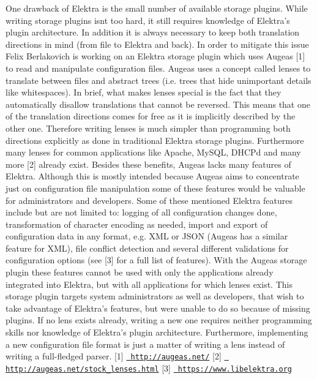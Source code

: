 One drawback of Elektra is the small number of available storage plugins. While writing storage plugins isn\textquotesingle{}t too hard, it still requires knowledge of Elektra’s plugin architecture. In addition it is always necessary to keep both translation directions in mind (from file to Elektra and back). In order to mitigate this issue Felix Berlakovich is working on an Elektra storage plugin which uses Augeas \mbox{[}1\mbox{]} to read and manipulate configuration files. Augeas uses a concept called lenses to translate between files and abstract trees (i.\+e. trees that hide unimportant details like whitespaces). In brief, what makes lenses special is the fact that they automatically disallow translations that cannot be reversed. This means that one of the translation directions comes for free as it is implicitly described by the other one. Therefore writing lenses is much simpler than programming both directions explicitly as done in traditional Elektra storage plugins. Furthermore many lenses for common applications like Apache, My\+S\+QL, D\+H\+C\+Pd and many more \mbox{[}2\mbox{]} already exist. Besides these benefits, Augeas lacks many features of Elektra. Although this is mostly intended because Augeas aims to concentrate just on configuration file manipulation some of these features would be valuable for administrators and developers. Some of these mentioned Elektra features include but are not limited to\+: logging of all configuration changes done, transformation of character encoding as needed, import and export of configuration data in any format, e.\+g. X\+ML or J\+S\+ON (Augeas has a similar feature for X\+ML), file conflict detection and several different validations for configuration options (see \mbox{[}3\mbox{]} for a full list of features). With the Augeas storage plugin these features cannot be used with only the applications already integrated into Elektra, but with all applications for which lenses exist. This storage plugin targets system administrators as well as developers, that wish to take advantage of Elektra’s features, but were unable to do so because of missing plugins. If no lens exists already, writing a new one requires neither programming skills nor knowledge of Elektra’s plugin architecture. Furthermore, implementing a new configuration file format is just a matter of writing a lens instead of writing a full-\/fledged parser. \mbox{[}1\mbox{]} \href{http://augeas.net/}{\texttt{ http\+://augeas.\+net/}} \mbox{[}2\mbox{]} \href{http://augeas.net/stock_lenses.html}{\texttt{ http\+://augeas.\+net/stock\+\_\+lenses.\+html}} \mbox{[}3\mbox{]} \href{https://www.libelektra.org}{\texttt{ https\+://www.\+libelektra.\+org}}

